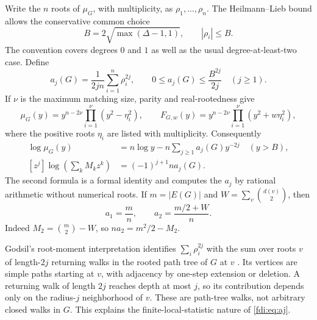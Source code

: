 \documentclass[11pt,letterpaper]{article}
\theoremstyle{remark}\newtheorem{remark}[theorem]{Remark}
\begin{document}
Write the $n$ roots of $\mu_G$, with multiplicity, as $\rho_1,\ldots,\rho_n$. The Heilmann--Lieb bound allows the conservative common choice
\begin{equation}\label{fdi:eq:B}
 B=2\sqrt{\max(\Delta-1,1)},\qquad |\rho_i|\le B.
\end{equation}
The convention covers degrees $0$ and $1$ as well as the usual degree-at-least-two case. Define
\begin{equation}\label{fdi:eq:aj}
 a_j(G)=\frac1{2jn}\sum_{i=1}^n\rho_i^{2j},\qquad
 0\le a_j(G)\le\frac{B^{2j}}{2j}\quad(j\ge1).
\end{equation}
If $\nu$ is the maximum matching size, parity and real-rootedness give
\begin{equation}\label{fdi:eq:paired}
 \mu_G(y)=y^{n-2\nu}\prod_{i=1}^{\nu}(y^2-\eta_i^2),\qquad
 F_{G,w}(y)=y^{n-2\nu}\prod_{i=1}^{\nu}(y^2+w\eta_i^2),
\end{equation}
where the positive roots $\eta_i$ are listed with multiplicity. Consequently
\begin{align}
 \log\mu_G(y)&=n\log y-n\sum_{j\ge1}a_j(G)y^{-2j}\quad(y>B),\label{fdi:eq:logroot}\\
 [z^j]\log\!\left(\sum_k M_kz^k\right)&=(-1)^{j+1}n a_j(G).\label{fdi:eq:logmatching}
\end{align}
The second formula is a formal identity and computes the $a_j$ by rational arithmetic without numerical roots. If $m=|E(G)|$ and $W=\sum_v\binom{d(v)}2$, then
\begin{equation}\label{fdi:eq:a12}
 a_1=\frac mn,\qquad a_2=\frac{m/2+W}{n}.
\end{equation}
Indeed $M_2=\binom m2-W$, so $n a_2=m^2/2-M_2$.

Godsil's root-moment interpretation identifies $\sum_i\rho_i^{2j}$ with the sum over roots $v$ of length-$2j$ returning walks in the rooted path tree of $G$ at $v$ \cite{godsilwalks}. Its vertices are simple paths starting at $v$, with adjacency by one-step extension or deletion. A returning walk of length $2j$ reaches depth at most $j$, so its contribution depends only on the radius-$j$ neighborhood of $v$. These are path-tree walks, not arbitrary closed walks in $G$. This explains the finite-local-statistic nature of \eqref{fdi:eq:aj}.
\end{document}
